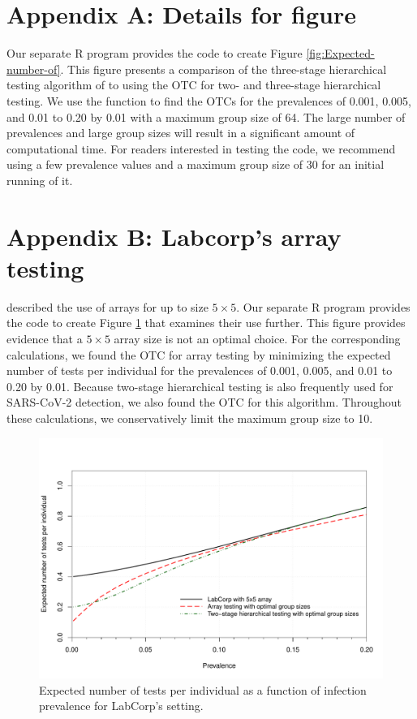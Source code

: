 \section*{Appendix A: Details for figure}

Our separate R program provides the code to create Figure \ref{fig:Expected-number-of}.
This figure presents a comparison of the three-stage hierarchical
testing algorithm of \citet{lohse2020pooling} to using the OTC for
two- and three-stage hierarchical testing. We use the 
function to find the OTCs for the prevalences of 0.001, 0.005, and
0.01 to 0.20 by 0.01 with a maximum group size of 64. The large number
of prevalences and large group sizes will result in a significant
amount of computational time. For readers interested in testing the
code, we recommend using a few prevalence values and a maximum group
size of 30 for an initial running of it. 

\section*{Appendix B: Labcorp's array testing}

\citet{LabCorp} described the use of arrays for up to size $5\times5$.
Our separate R program provides the code  to create Figure \ref{fig:LabCorp}
that examines their use further. This figure  provides evidence that
a $5\times5$ array size is not an optimal choice. For the corresponding
calculations, we found the OTC for array testing by minimizing the
expected number of tests per individual for the prevalences of 0.001,
0.005, and 0.01 to 0.20 by 0.01. Because two-stage hierarchical testing
is also frequently used for SARS-CoV-2 detection, we also found the
OTC for this algorithm. Throughout these calculations, we conservatively
limit the maximum group size to 10. 

\begin{figure}
\noindent \begin{centering}
\includegraphics[scale=0.55]{figures/LabCorp.pdf}
\par\end{centering}
\caption{Expected number of tests per individual as a function of infection
prevalence for LabCorp's setting. \label{fig:LabCorp}}
\end{figure}

